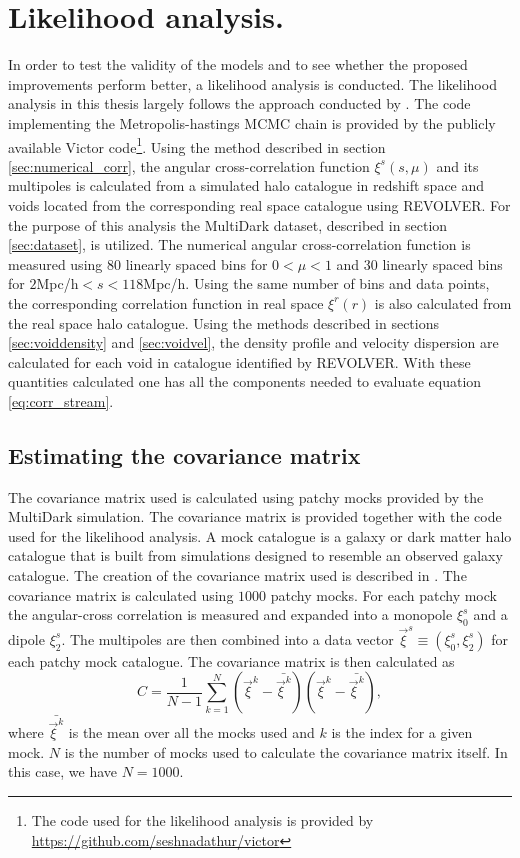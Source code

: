 \section{Likelihood analysis.}\label{sec:maximum_likelihood_method}
In order to test the validity of the models and to see whether the proposed improvements perform better, a likelihood analysis is conducted. The likelihood analysis in this thesis largely follows the approach conducted by \cite{BeyondBAO}. The code implementing the Metropolis-hastings MCMC chain is provided by the publicly available Victor code\footnote{The code used for the likelihood analysis is provided by \url{https://github.com/seshnadathur/victor}}. Using the method described in section \ref{sec:numerical_corr}, the angular cross-correlation function $\xi^s(s,\mu)$ and its multipoles is calculated from a simulated halo catalogue in redshift space and voids located from the corresponding real space catalogue using REVOLVER. For the purpose of this analysis the MultiDark dataset, described in section \ref{sec:dataset}, is utilized. The numerical angular cross-correlation function is measured using $80$ linearly spaced bins for $0<\mu<1$ and $30$ linearly spaced bins for $2$Mpc/h$<s<118$Mpc/h. Using the same number of bins and data points, the corresponding correlation function in real space $\xi^r(r)$ is also calculated from the real space halo catalogue. Using the methods described in sections \ref{sec:voiddensity} and \ref{sec:voidvel}, the density profile and velocity dispersion are calculated for each void in catalogue identified by REVOLVER. With these quantities calculated one has all the components needed to evaluate equation \ref{eq:corr_stream}.
\subsection{Estimating the covariance matrix}
The covariance matrix used is calculated using patchy mocks provided by the MultiDark simulation\cite{MDmock1}\cite{MDmock2}. The covariance matrix is provided together with the code used for the likelihood analysis. A mock catalogue is a galaxy or dark matter halo catalogue that is built from simulations designed to resemble an observed galaxy catalogue. The creation of the covariance matrix used is described in \cite{BeyondBAO}. The covariance matrix is calculated using $1000$ patchy mocks. For each patchy mock the angular-cross correlation is measured and expanded into a monopole $\xi_0^s$ and a dipole $\xi_2^s$. The multipoles are then combined into a data vector $\vec{\xi}^s\equiv(\xi_0^s, \xi_2^s)$ for each patchy mock catalogue. The covariance matrix is then calculated as
\begin{equation}
    C=\frac{1}{N-1}\sum_{k=1}^N(\vec{\xi} ^k-\bar{\vec{\xi}^k})(\vec{\xi}^k-\bar{\vec{\xi}^k}),
\end{equation} 
where $\bar{\vec{\xi}^k}$ is the mean over all the mocks used and $k$ is the index for a given mock. $N$ is the number of mocks used to calculate the covariance matrix itself. In this case, we have $N=1000$.
